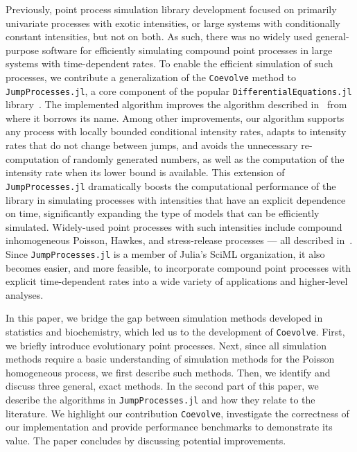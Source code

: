 \documentclass{juliacon}
\begin{document}
Previously, point process simulation library development focused on primarily univariate processes with exotic intensities, or large systems with conditionally constant intensities, but not on both. As such, there was no widely used general-purpose software for efficiently simulating compound point processes in large systems with time-dependent rates. To enable the efficient simulation of such processes, we contribute a generalization of the \texttt{Coevolve} method to \texttt{JumpProcesses.jl}, a core component of the popular \texttt{DifferentialEquations.jl} library~\cite{DifferentialEquations.jl-2017}. The implemented algorithm improves the algorithm described in~\cite{farajtabar2017} from where it borrows its name. Among other improvements, our algorithm supports any process with locally bounded conditional intensity rates, adapts to intensity rates that do not change between jumps, and avoids the unnecessary re-computation of randomly generated numbers, as well as the computation of the intensity rate when its lower bound is available. This extension of \texttt{JumpProcesses.jl} dramatically boosts the computational performance of the library in simulating processes with intensities that have an explicit dependence on time,  significantly expanding the type of models that can be efficiently simulated. Widely-used point processes with such intensities include compound inhomogeneous Poisson, Hawkes, and stress-release processes --- all described in~\cite{daley2003}. Since \texttt{JumpProcesses.jl} is a member of Julia's SciML organization, it also becomes easier, and more feasible, to incorporate compound point processes with explicit time-dependent rates into a wide variety of applications and higher-level analyses.

In this paper, we bridge the gap between simulation methods developed in statistics and biochemistry, which led us to the development of \texttt{Coevolve}. First, we briefly introduce evolutionary point processes. Next, since all simulation methods require a basic understanding of simulation methods for the Poisson homogeneous process, we first describe such methods. Then, we identify and discuss three general, exact methods. In the second part of this paper, we describe the algorithms in \texttt{JumpProcesses.jl} and how they relate to the literature. We highlight our contribution \texttt{Coevolve}, investigate the correctness of our implementation and provide performance benchmarks to demonstrate its value. The paper concludes by discussing potential improvements.
\end{document}
